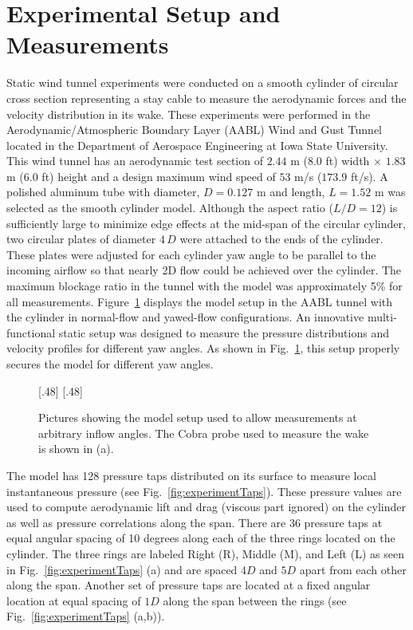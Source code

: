 \section{Experimental Setup and Measurements}
\label{sec:experiments}
%
Static wind tunnel experiments were conducted on a smooth cylinder of circular
cross section representing a stay cable to measure the aerodynamic forces and
the velocity distribution in its wake. These experiments were performed in the
Aerodynamic/Atmospheric Boundary Layer (AABL) Wind and Gust Tunnel located in
the Department of Aerospace Engineering at Iowa State University. This wind
tunnel has an aerodynamic test section of $2.44$ m ($8.0$ ft) width $\times$
$1.83$ m ($6.0$ ft) height and a design maximum wind speed of $53$ m/s ($173.9$
ft/s). A polished aluminum tube with diameter, $D=0.127$ m and length, $L=1.52$
m was selected as the smooth cylinder model. Although the aspect ratio
($L/D=12$) is sufficiently large to minimize edge effects at the mid-span of
the circular cylinder, two circular plates of diameter $4\,D$ were attached to
the ends of the cylinder. These plates were adjusted for each cylinder yaw
angle to be parallel to the incoming airflow so that nearly 2D flow could be
achieved over the cylinder. The maximum blockage ratio in the tunnel with the
model was approximately 5\% for all measurements. Figure~\ref{fig:ExpSetup}
displays the model setup in the AABL tunnel with the cylinder in normal-flow
and yawed-flow configurations. An innovative multi-functional static setup was
designed to measure the pressure distributions and velocity profiles for
different yaw angles. As shown in Fig.~\ref{fig:ExpSetup}, this setup properly
secures the model for different yaw angles.
%
\begin{figure}[htb!]
  \centering
    [.48\linewidth]{}
  \hspace*{\fill}
    [.48\linewidth]{}
  \caption{Pictures showing the model setup used to allow measurements at
    arbitrary inflow angles. The Cobra probe used to measure the wake is shown in
    (a).}
  \label{fig:ExpSetup}
\end{figure}

The model has 128 pressure taps distributed on its surface to measure local
instantaneous pressure (see Fig.~\ref{fig:experimentTaps}). These pressure
values are used to compute aerodynamic lift and drag (viscous part ignored) on
the cylinder as well as pressure correlations along the span. There are 36
pressure taps at equal angular spacing of 10 degrees along each of the three
rings located on the cylinder. The three rings are labeled Right (R), Middle
(M), and Left (L) as seen in Fig.~\ref{fig:experimentTaps} (a) and are spaced
$4D$ and $5D$ apart from each other along the span. Another set of pressure
taps are located at a fixed angular location at equal spacing of $1D$ along the
span between the rings (see Fig.~\ref{fig:experimentTaps} (a,b)).

